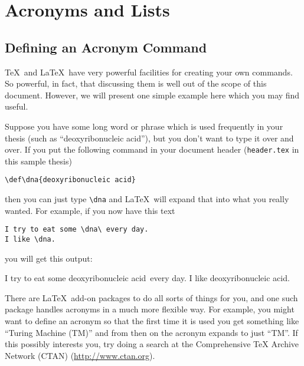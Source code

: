 

\chapter{Acronyms and Lists}
\label{chap:ACRONYMS_AND_LISTS}

\section{Defining an Acronym Command}

\TeX\ and \LaTeX\ have very powerful facilities for creating your own
commands.  So powerful, in fact, that discussing them is well out of
the scope of this document.  However, we will present one simple
example here which you may find useful.

Suppose you have some long word or phrase which is used frequently in
your thesis (such as ``deoxyribonucleic acid''), but you don't want to
type it over and over.  If you put the following command in your
document header (\verb|header.tex| in this sample thesis)
\begin{verbatim}
\def\dna{deoxyribonucleic acid}
\end{verbatim}
then you can just type \verb|\dna| and \LaTeX\ will expand that into
what you really wanted.  For example, if you now have this text

\def\dna{deoxyribonucleic acid}

\begin{verbatim}
I try to eat some \dna\ every day.
I like \dna.
\end{verbatim}
you will get this output:

\vspace{6 pt}
I try to eat some \dna\ every day.
I like \dna.

\vspace{6 pt}


There are \LaTeX\ add-on packages to do all sorts of things for you,
and one such package handles acronyms in a much more flexible way.
For example, you might want to define an acronym so that the first
time it is used you get something like ``Turing Machine (TM)'' and
from then on the acronym expands to just ``TM''.  If this possibly
interests you, try doing a search at the Comprehensive TeX Archive
Network (CTAN) (\url{http://www.ctan.org}).

